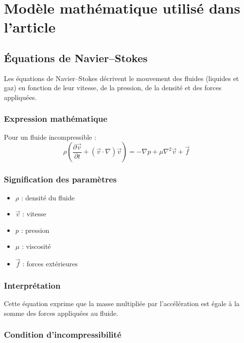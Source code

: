 \documentclass[12pt,a4paper]{report}
\begin{document}

\chapter{Modèle mathématique utilisé dans l’article}

\section{Équations de Navier–Stokes}
Les équations de Navier--Stokes décrivent le mouvement des fluides (liquides et gaz) en fonction de leur vitesse, de la pression, de la densité et des forces appliquées.

\subsection*{Expression mathématique}

Pour un fluide incompressible :
\begin{equation}
\rho \left( \frac{\partial \vec{v}}{\partial t} + (\vec{v} \cdot \nabla)\vec{v} \right)
= -\nabla p + \mu \nabla^2 \vec{v} + \vec{f}
\end{equation}

\subsection*{Signification des paramètres}

\begin{itemize}
    \item $\rho$ : densité du fluide
    \item $\vec{v}$ : vitesse
    \item $p$ : pression
    \item $\mu$ : viscosité
    \item $\vec{f}$ : forces extérieures
\end{itemize}

\subsection*{Interprétation}

Cette équation exprime que la masse multipliée par l'accélération est égale à la somme des forces appliquées au fluide.

\subsection*{Condition d’incompressibilité}
\end{document}
